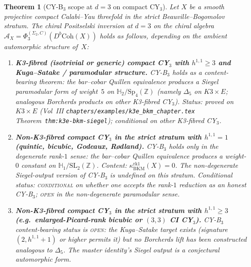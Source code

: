 \documentclass[11pt]{amsart}
\newtheorem{theorem}{Theorem}[section]
\providecommand{\Z}{\mathbb{Z}}
\providecommand{\cA}{\mathcal{A}}
\providecommand{\Sp}{\mathrm{Sp}}
\providecommand{\SL}{\mathrm{SL}}
\providecommand{\Coh}{\mathrm{Coh}}
\providecommand{\kBKM}{\kappa_{\mathrm{BKM}}}
\begin{document}
\begin{theorem}[CY-B$_3$ scope at $d = 3$ on compact CY$_3$]
\label{thm:cy-b3-scope-quintic}
Let $X$ be a smooth projective compact Calabi--Yau threefold in the
strict Beauville--Bogomolov stratum. The chiral Positselski
inversion at $d = 3$ on the chiral algebra
$\cA_X = \Phi_3^{(\Sigma_2, C)}(D^b\Coh(X))$ holds as follows,
depending on the ambient automorphic structure of~$X$:
\begin{enumerate}[label=\textup{(\Roman*)}]
\item \textbf{K3-fibred (isotrivial or generic) compact CY$_3$
with $h^{1,1} \geq 3$ and Kuga--Satake / paramodular structure.}
CY-B$_3$ holds as a content-bearing theorem: the bar--cobar Quillen
equivalence produces a Siegel paramodular form of weight~$5$ on
$\mathbb{H}_2 / \Sp_4(\Z)$ (namely $\Delta_5$ on $K3 \times E$;
analogous Borcherds products on other K3-fibred CY$_3$). Status:
proved on $K3 \times E$ (Vol~III \texttt{chapters/examples/k3e\_bkm\_chapter.tex}
Theorem~\texttt{thm:k3e-bkm-siegel}); conditional on other
K3-fibred CY$_3$.
\item \textbf{Non-K3-fibred compact CY$_3$ in the strict stratum with
$h^{1,1} = 1$ (quintic, bicubic, Godeaux, R{\o}dland).} CY-B$_3$
holds only in the degenerate rank-$1$ sense: the bar--cobar Quillen
equivalence produces a weight-$0$ constant on $\mathbb{H}_1 /
\SL_2(\Z)$. Content: $\kBKM^{\mathrm{rk}1}(X) = 0$. The
non-degenerate Siegel-output version of CY-B$_3$ is
\emph{undefined} on this stratum. Conditional status:
\textsc{conditional} on whether one accepts the rank-$1$ reduction as
an honest CY-B$_3$; \textsc{open} in the non-degenerate paramodular
sense.
\item \textbf{Non-K3-fibred compact CY$_3$ in the strict stratum with
$h^{1,1} \geq 3$ (e.g.\ enlarged-Picard-rank bicubic or $(3,3)$ CI
CY$_3$).} CY-B$_3$ content-bearing status is \textsc{open}: the
Kuga--Satake target exists (signature $(2, h^{1,1} + 1)$ or higher
permits it) but no Borcherds lift has been constructed analogous to
$\Delta_5$. The master identity's Siegel output is a conjectural
automorphic form.
\end{enumerate}
\end{theorem}
\end{document}
